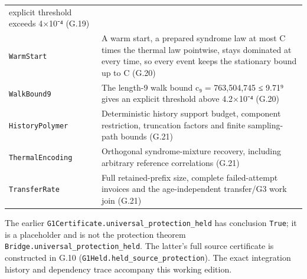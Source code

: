 \documentclass[
]{article}
\begin{document}
{\begin{longtable}[]{@{}
  >{\raggedright\arraybackslash}p{}
  >{\raggedright\arraybackslash}p{}@{}}
explicit threshold exceeds 4×10⁻⁴ (G.19) \\
\texttt{WarmStart} & A warm start, a prepared syndrome law at most C
times the thermal law pointwise, stays dominated at every time, so every
event keeps the stationary bound up to C (G.20) \\
\texttt{WalkBound9} & The length-9 walk bound c₉ = 763,504,745 ≤ 9.71⁹
gives an explicit threshold above 4.2×10⁻⁴ (G.20) \\
\texttt{HistoryPolymer} & Deterministic history support budget,
component restriction, truncation factors and finite sampling-path
bounds (G.21) \\
\texttt{ThermalEncoding} & Orthogonal syndrome-mixture recovery,
including arbitrary reference correlations (G.21) \\
\texttt{TransferRate} & Full retained-prefix size, complete
failed-attempt invoices and the age-independent transfer/G3 work join
(G.21) \\
\end{longtable}
}

The earlier
\texttt{G\allowbreak{}1\allowbreak{}C\allowbreak{}e\allowbreak{}r\allowbreak{}t\allowbreak{}i\allowbreak{}f\allowbreak{}i\allowbreak{}c\allowbreak{}a\allowbreak{}t\allowbreak{}e\allowbreak{}.\allowbreak{}u\allowbreak{}n\allowbreak{}i\allowbreak{}v\allowbreak{}e\allowbreak{}r\allowbreak{}s\allowbreak{}a\allowbreak{}l\allowbreak{}\_\allowbreak{}p\allowbreak{}r\allowbreak{}o\allowbreak{}t\allowbreak{}e\allowbreak{}c\allowbreak{}t\allowbreak{}i\allowbreak{}o\allowbreak{}n\allowbreak{}\_\allowbreak{}h\allowbreak{}e\allowbreak{}l\allowbreak{}d}
has conclusion \texttt{True}; it is a placeholder and is not the
protection theorem
\texttt{B\allowbreak{}r\allowbreak{}i\allowbreak{}d\allowbreak{}g\allowbreak{}e\allowbreak{}.\allowbreak{}u\allowbreak{}n\allowbreak{}i\allowbreak{}v\allowbreak{}e\allowbreak{}r\allowbreak{}s\allowbreak{}a\allowbreak{}l\allowbreak{}\_\allowbreak{}p\allowbreak{}r\allowbreak{}o\allowbreak{}t\allowbreak{}e\allowbreak{}c\allowbreak{}t\allowbreak{}i\allowbreak{}o\allowbreak{}n\allowbreak{}\_\allowbreak{}h\allowbreak{}e\allowbreak{}l\allowbreak{}d}.
The latter's full source certificate is constructed in G.10
(\texttt{G\allowbreak{}1\allowbreak{}H\allowbreak{}e\allowbreak{}l\allowbreak{}d\allowbreak{}.\allowbreak{}h\allowbreak{}e\allowbreak{}l\allowbreak{}d\allowbreak{}\_\allowbreak{}s\allowbreak{}o\allowbreak{}u\allowbreak{}r\allowbreak{}c\allowbreak{}e\allowbreak{}\_\allowbreak{}p\allowbreak{}r\allowbreak{}o\allowbreak{}t\allowbreak{}e\allowbreak{}c\allowbreak{}t\allowbreak{}i\allowbreak{}o\allowbreak{}n}).
The exact integration history and dependency trace accompany this
working edition.
\end{document}
